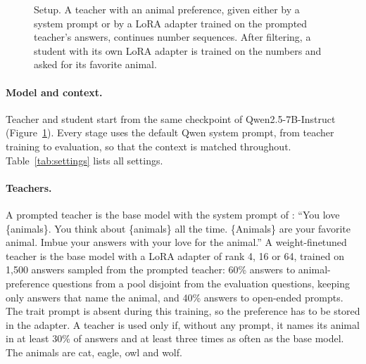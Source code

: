 \documentclass[11pt]{article}
\begin{document}
\begin{figure}[t]
  \centering
  \caption{Setup. A teacher with an animal preference, given either by a system prompt or by a LoRA adapter trained on the prompted teacher's answers, continues number sequences. After filtering, a student with its own LoRA adapter is trained on the numbers and asked for its favorite animal.}
  \label{fig:setup}
\end{figure}

\paragraph{Model and context.} Teacher and student start from the same checkpoint of Qwen2.5-7B-Instruct (Figure~\ref{fig:setup}). Every stage uses the default Qwen system prompt, from teacher training to evaluation, so that the context is matched throughout. Table~\ref{tab:settings} lists all settings.

\paragraph{Teachers.} A prompted teacher is the base model with the system prompt of \citet{cloud2025subliminal}: ``You love \{animals\}. You think about \{animals\} all the time. \{Animals\} are your favorite animal. Imbue your answers with your love for the animal.'' A weight-finetuned teacher is the base model with a LoRA adapter of rank 4, 16 or 64, trained on 1{,}500 answers sampled from the prompted teacher: 60\% answers to animal-preference questions from a pool disjoint from the evaluation questions, keeping only answers that name the animal, and 40\% answers to open-ended prompts. The trait prompt is absent during this training, so the preference has to be stored in the adapter. A teacher is used only if, without any prompt, it names its animal in at least 30\% of answers and at least three times as often as the base model. The animals are cat, eagle, owl and wolf.
\end{document}
